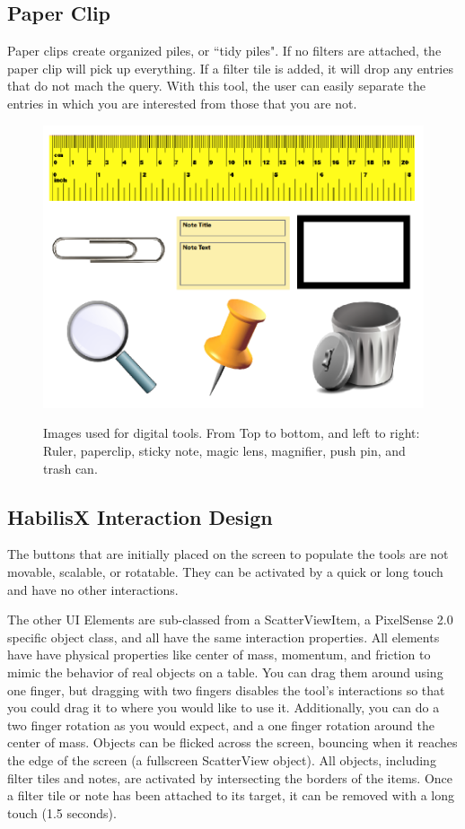 \documentclass{article}
\begin{document}
\subsection*{Paper Clip}
Paper clips create organized piles, or ``tidy piles".  If no filters are attached, the paper clip will pick up everything.  If a filter tile is added, it will drop any entries that do not mach the query.   With this tool, the user can easily separate the entries in which you are interested from those that you are not.

\begin{figure}[t]
\centering
\scalebox{.623}
{\includegraphics{ToolsFigure.png}}
\caption{Images used for digital tools.  From Top to bottom, and left to right: Ruler, paperclip, sticky note, magic lens, magnifier, push pin, and trash can.}  
\end{figure} 


\subsection{HabilisX Interaction Design}
The buttons that are initially placed on the screen to populate the tools are not movable, scalable, or rotatable.  They can be activated by a quick or long touch and have no other interactions.  

The other UI Elements are sub-classed from a ScatterViewItem, a PixelSense 2.0 specific object class, and all have the same interaction properties.  All elements have have physical properties like center of mass, momentum, and friction to mimic the behavior of real objects on a table.  You can drag them around using one finger, but dragging with two fingers  disables the tool's interactions so that you could drag it to where you would like to use it.  Additionally, you can do a two finger rotation as you would expect, and a one finger rotation around the center of mass.  Objects can be flicked across the screen, bouncing when it reaches the edge of the screen (a fullscreen ScatterView object).  All objects, including filter tiles and notes, are activated by intersecting the borders of the items.  Once a filter tile or note has been attached to its target, it can be removed with a long touch (1.5 seconds).  
\end{document}
